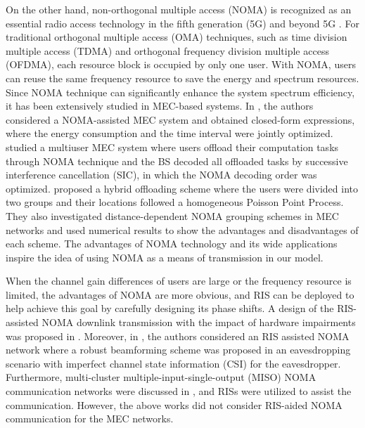 \documentclass[journal]{IEEEtran}
\begin{document}
On the other hand, non-orthogonal multiple access (NOMA) is recognized as an essential radio access technology in the fifth generation (5G) and beyond 5G \cite{NOMA}.
For traditional orthogonal multiple access (OMA) techniques, such as time division multiple access (TDMA) and orthogonal frequency division multiple access (OFDMA), each resource block is occupied by only one user. With NOMA, users can reuse the same frequency resource to save the energy and spectrum resources.
Since NOMA technique can significantly enhance the system spectrum efficiency, it has been extensively studied in MEC-based systems.
In \cite{NOMAmecDing}, the authors considered a NOMA-assisted MEC system and obtained closed-form expressions, where the energy consumption and the time interval were jointly optimized. \cite{NOMAmecWang} studied a multiuser MEC system where users offload their computation tasks through NOMA technique and the BS decoded all offloaded tasks by successive interference cancellation (SIC), in which the NOMA decoding order was optimized.
\cite{YeY} proposed a hybrid offloading scheme where the users were divided into two groups and their locations followed a homogeneous Poisson Point Process. They also investigated distance-dependent NOMA grouping schemes in MEC networks and used numerical results to show the advantages and disadvantages of each scheme.
The advantages of NOMA technology and its wide applications inspire the idea of using NOMA as a means of transmission in our model.

{When the channel gain differences of users are large or the frequency resource is limited, the advantages of NOMA are more obvious, and RIS can be deployed to help achieve this goal by carefully designing its phase shifts. A design of the RIS-assisted NOMA downlink transmission with the impact of hardware impairments was proposed in \cite{dingz}. Moreover, in \cite{zhengNOMARIS}, the authors considered an RIS assisted NOMA network where a robust beamforming scheme was proposed in an eavesdropping scenario with imperfect channel state information (CSI) for the eavesdropper. Furthermore, multi-cluster multiple-input-single-output (MISO) NOMA communication networks were discussed in \cite{yiqingNOMARIS}, and RISs were utilized to assist the communication. However, the above works \cite{dingz,zhengNOMARIS,yiqingNOMARIS} did not consider RIS-aided NOMA communication for the MEC networks.}
\end{document}
